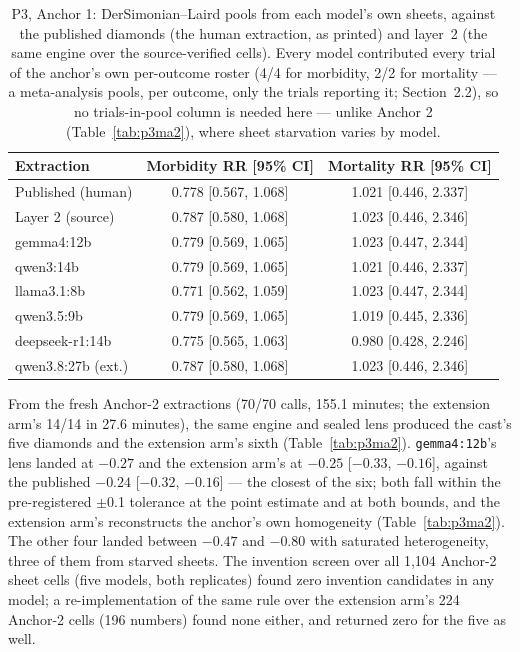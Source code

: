 \documentclass[11pt]{article}
\begin{document}
\begin{table}[H]
\centering\small
\caption{P3, Anchor 1: DerSimonian--Laird pools from each model's own sheets, against the published diamonds (the human extraction, as printed) and layer~2 (the same engine over the source-verified cells). Every model contributed every trial of the anchor's own per-outcome roster (4/4 for morbidity, 2/2 for mortality --- a meta-analysis pools, per outcome, only the trials reporting it; Section~2.2), so no trials-in-pool column is needed here --- unlike Anchor 2 (Table~\ref{tab:p3ma2}), where sheet starvation varies by model.}
\label{tab:p3ma1}
\begin{tabular}{lcc}
\toprule
Extraction & Morbidity RR [95\% CI] & Mortality RR [95\% CI] \\
\midrule
Published (human) & 0.778 [0.567, 1.068] & 1.021 [0.446, 2.337] \\
Layer 2 (source) & 0.787 [0.580, 1.068] & 1.023 [0.446, 2.346] \\
\midrule
gemma4:12b & 0.779 [0.569, 1.065] & 1.023 [0.447, 2.344] \\
qwen3:14b & 0.779 [0.569, 1.065] & 1.021 [0.446, 2.337] \\
llama3.1:8b & 0.771 [0.562, 1.059] & 1.023 [0.447, 2.344] \\
qwen3.5:9b & 0.779 [0.569, 1.065] & 1.019 [0.445, 2.336] \\
deepseek-r1:14b & 0.775 [0.565, 1.063] & 0.980 [0.428, 2.246] \\
\midrule
qwen3.8:27b (ext.) & 0.787 [0.580, 1.068] & 1.023 [0.446, 2.346] \\
\bottomrule
\end{tabular}
\end{table}

From the fresh Anchor-2 extractions (70/70 calls, 155.1 minutes; the extension arm's 14/14 in 27.6 minutes), the same engine and sealed lens produced the cast's five diamonds and the extension arm's sixth (Table~\ref{tab:p3ma2}). \texttt{gemma4:12b}'s lens landed at $-0.27$ and the extension arm's at $-0.25$ [$-0.33$, $-0.16$], against the published $-0.24$ [$-0.32$, $-0.16$] --- the closest of the six; both fall within the pre-registered $\pm$0.1 tolerance at the point estimate and at both bounds, and the extension arm's reconstructs the anchor's own homogeneity (Table~\ref{tab:p3ma2}). The other four landed between $-0.47$ and $-0.80$ with saturated heterogeneity, three of them from starved sheets. The invention screen over all 1{,}104 Anchor-2 sheet cells (five models, both replicates) found zero invention candidates in any model; a re-implementation of the same rule over the extension arm's 224 Anchor-2 cells (196 numbers) found none either, and returned zero for the five as well.
\end{document}
